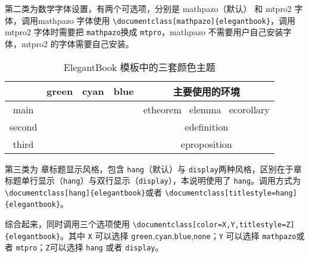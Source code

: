 \documentclass[mathpazo,titlestyle=hang,11pt]{elegantbook}
\begin{document}
第二类为{\color{main}数学字体}设置，有两个可选项，分别是 mathpazo（默认） 和 mtpro2 字体，调用mathpazo 字体使用 \verb|\documentclass[mathpazo]{elegantbook}|，调用 mtpro2 字体时需要把 \verb|mathpazo|换成 \verb|mtpro|，mathpazo 不需要用户自己安装字体，mtpro2 的字体需要自己安装。

\begin{table}[htp]
\centering
\begin{tabular}{ccccc}
\toprule
	  & green & cyan & blue & 主要使用的环境\\
\midrule
main & \makecell{{\color{main1}\rule{1cm}{1cm}}}& \makecell{{\color{main2}\rule{1cm}{1cm}}}&\makecell{ {\color{main3}\rule{1cm}{1cm}}}& etheorem \ elemma \ ecorollary\\

second &\makecell{ {\color{second1}\rule{1cm}{1cm}}}& \makecell{{\color{second2}\rule{1cm}{1cm}}}&\makecell{ {\color{second3}\rule{1cm}{1cm}}}&edefinition\\

third &\makecell{ {\color{third1}\rule{1cm}{1cm}}}& \makecell{{\color{third2}\rule{1cm}{1cm}}}&\makecell{ {\color{third3}\rule{1cm}{1cm}}}&eproposition\\
\bottomrule
\end{tabular}
\caption{ElegantBook 模板中的三套颜色主题\label{tab:color thm}}
\end{table}

第三类为{\color{main} 章标题显示风格}，包含 \verb|hang|（默认）与 \verb|display|两种风格，区别在于章标题单行显示（\verb|hang|）与双行显示（\verb|display|），本说明使用了 \verb|hang|。调用方式为 \verb|\documentclass[hang]{elegantbook}|或者 \verb|\documentclass[titlestyle=hang]{elegantbook}|。

综合起来，同时调用三个选项使用 \verb|\documentclass[color=X,Y,titlestyle=Z]{elegantbook}|。其中 \verb|X| 可以选择 \verb|green|,\verb|cyan|,\verb|blue|,\verb|none|；\verb|Y| 可以选择 \verb|mathpazo|或者 \verb|mtpro|；\verb|Z|可以选择 \verb|hang| 或者 \verb|display|。
\end{document}
